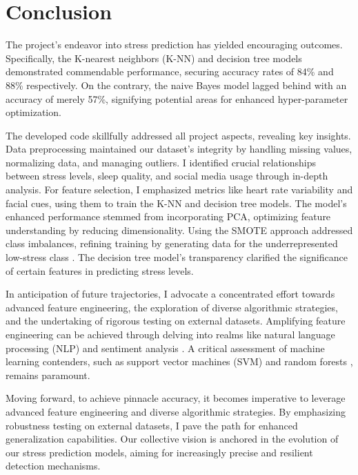 \documentclass{article}
\begin{document}

\section{Conclusion}

The project's endeavor into stress prediction has yielded encouraging outcomes. Specifically, the K-nearest neighbors (K-NN) and decision tree models demonstrated commendable performance, securing accuracy rates of 84\% and 88\% respectively. On the contrary, the naive Bayes model lagged behind with an accuracy of merely 57\%, signifying potential areas for enhanced hyper-parameter optimization.


The developed code skillfully addressed all project aspects, revealing key insights. Data preprocessing maintained our dataset's integrity by handling missing values, normalizing data, and managing outliers. I identified crucial relationships between stress levels, sleep quality, and social media usage through in-depth analysis. For feature selection, I emphasized metrics like heart rate variability and facial cues, using them to train the K-NN and decision tree models. The model's enhanced performance stemmed from incorporating PCA, optimizing feature understanding by reducing dimensionality. Using the SMOTE approach addressed class imbalances, refining training by generating data for the underrepresented low-stress class \cite{daud2023}. The decision tree model's transparency clarified the significance of certain features in predicting stress levels.



In anticipation of future trajectories, I advocate a concentrated effort towards advanced feature engineering, the exploration of diverse algorithmic strategies, and the undertaking of rigorous testing on external datasets. Amplifying feature engineering can be achieved through delving into realms like natural language processing (NLP) \cite{nijhawan2022} and sentiment analysis \cite{rosa2018}. A critical assessment of machine learning contenders, such as support vector machines (SVM)\cite{ahuja2019} and random forests \cite{dahal2023}, remains paramount.

Moving forward, to achieve pinnacle accuracy, it becomes imperative to leverage advanced feature engineering and diverse algorithmic strategies. By emphasizing robustness testing on external datasets, I pave the path for enhanced generalization capabilities. Our collective vision is anchored in the evolution of our stress prediction models, aiming for increasingly precise and resilient detection mechanisms.
\end{document}
